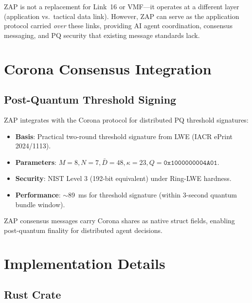 \documentclass[11pt,letterpaper]{article}
\begin{document}
ZAP is not a replacement for Link~16 or VMF---it operates at a different layer (application vs.\ tactical data link). However, ZAP can serve as the application protocol carried \emph{over} these links, providing AI agent coordination, consensus messaging, and PQ security that existing message standards lack.

\section{Corona Consensus Integration}

\subsection{Post-Quantum Threshold Signing}

ZAP integrates with the Corona protocol for distributed PQ threshold signatures:

\begin{itemize}
\item \textbf{Basis}: Practical two-round threshold signature from LWE (IACR ePrint 2024/1113).
\item \textbf{Parameters}: $M=8, N=7, \bar{D}=48, \kappa=23, Q=\mathtt{0x1000000004A01}$.
\item \textbf{Security}: NIST Level 3 (192-bit equivalent) under Ring-LWE hardness.
\item \textbf{Performance}: $\sim$89~ms for threshold signature (within 3-second quantum bundle window).
\end{itemize}

ZAP consensus messages carry Corona shares as native struct fields, enabling post-quantum finality for distributed agent decisions.

\section{Implementation Details}

\subsection{Rust Crate}
\end{document}
